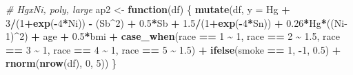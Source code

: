 \documentclass[12pt, twoside]{amherstthesis}
\newenvironment{Shaded}{\begin{snugshade}}{\end{snugshade}}
\newcommand{\AttributeTok}[1]{\textcolor[rgb]{0.13,0.29,0.53}{#1}}
\newcommand{\CommentTok}[1]{\textcolor[rgb]{0.56,0.35,0.01}{\textit{#1}}}
\newcommand{\ControlFlowTok}[1]{\textcolor[rgb]{0.13,0.29,0.53}{\textbf{#1}}}
\newcommand{\DecValTok}[1]{\textcolor[rgb]{0.00,0.00,0.81}{#1}}
\newcommand{\FloatTok}[1]{\textcolor[rgb]{0.00,0.00,0.81}{#1}}
\newcommand{\FunctionTok}[1]{\textcolor[rgb]{0.13,0.29,0.53}{\textbf{#1}}}
\newcommand{\NormalTok}[1]{#1}
\newcommand{\OtherTok}[1]{\textcolor[rgb]{0.56,0.35,0.01}{#1}}
\newcommand{\SpecialCharTok}[1]{\textcolor[rgb]{0.81,0.36,0.00}{\textbf{#1}}}
\begin{document}
\begin{Shaded}
\begin{Highlighting}[]
\CommentTok{\# HgxNi, poly, large}
\NormalTok{ap2 }\OtherTok{\textless{}{-}} \ControlFlowTok{function}\NormalTok{(df) \{}
  \FunctionTok{mutate}\NormalTok{(df, }\AttributeTok{y =} 
\NormalTok{           Hg }\SpecialCharTok{+} \DecValTok{3}\SpecialCharTok{/}\NormalTok{(}\DecValTok{1}\SpecialCharTok{+}\FunctionTok{exp}\NormalTok{(}\SpecialCharTok{{-}}\DecValTok{4}\SpecialCharTok{*}\NormalTok{Ni)) }\SpecialCharTok{{-}}\NormalTok{ (Sb}\SpecialCharTok{\^{}}\DecValTok{2}\NormalTok{) }\SpecialCharTok{+} \FloatTok{0.5}\SpecialCharTok{*}\NormalTok{Sb }\SpecialCharTok{+} \FloatTok{1.5}\SpecialCharTok{/}\NormalTok{(}\DecValTok{1}\SpecialCharTok{+}\FunctionTok{exp}\NormalTok{(}\SpecialCharTok{{-}}\DecValTok{4}\SpecialCharTok{*}\NormalTok{Sn)) }\SpecialCharTok{+} 
           \FloatTok{0.26}\SpecialCharTok{*}\NormalTok{Hg}\SpecialCharTok{*}\NormalTok{((Ni}\DecValTok{{-}1}\NormalTok{)}\SpecialCharTok{\^{}}\DecValTok{2}\NormalTok{) }\SpecialCharTok{+}
\NormalTok{           age }\SpecialCharTok{+} \FloatTok{0.5}\SpecialCharTok{*}\NormalTok{bmi }\SpecialCharTok{+} 
           \FunctionTok{case\_when}\NormalTok{(race }\SpecialCharTok{==} \DecValTok{1} \SpecialCharTok{\textasciitilde{}} \DecValTok{1}\NormalTok{, }
\NormalTok{                     race }\SpecialCharTok{==} \DecValTok{2} \SpecialCharTok{\textasciitilde{}} \FloatTok{1.5}\NormalTok{, }
\NormalTok{                     race }\SpecialCharTok{==} \DecValTok{3} \SpecialCharTok{\textasciitilde{}} \DecValTok{1}\NormalTok{, }
\NormalTok{                     race }\SpecialCharTok{==} \DecValTok{4} \SpecialCharTok{\textasciitilde{}} \DecValTok{1}\NormalTok{, }
\NormalTok{                     race }\SpecialCharTok{==} \DecValTok{5} \SpecialCharTok{\textasciitilde{}} \FloatTok{1.5}\NormalTok{) }\SpecialCharTok{+}
           \FunctionTok{ifelse}\NormalTok{(smoke }\SpecialCharTok{==} \DecValTok{1}\NormalTok{, }\SpecialCharTok{{-}}\DecValTok{1}\NormalTok{, }\FloatTok{0.5}\NormalTok{) }\SpecialCharTok{+}
           \FunctionTok{rnorm}\NormalTok{(}\FunctionTok{nrow}\NormalTok{(df), }\DecValTok{0}\NormalTok{, }\DecValTok{5}\NormalTok{))}
\NormalTok{\}}


\end{Highlighting}
\end{Shaded}
\end{document}
